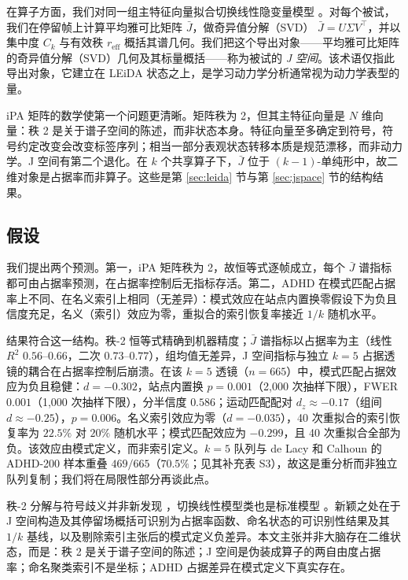 \documentclass[11pt]{ctexart}
\theoremstyle{definition}
\begin{document}
在算子方面，我们对同一组主特征向量拟合切换线性隐变量模型 \cite{Linderman2017,Taghia2018}。对每个被试，我们在停留帧上计算平均雅可比矩阵 $\bar J$，做奇异值分解（SVD） $\bar J=U\Sigma V^{\top}$，并以集中度 $C_k$ 与有效秩 $r_{\mathrm{eff}}$ 概括其谱几何。我们把这个导出对象——平均雅可比矩阵的奇异值分解（SVD）几何及其标量概括——称为被试的 \emph{J 空间}。该术语仅指此导出对象，它建立在 LEiDA 状态之上，是学习动力学分析通常视为动力学表型的量。

iPA 矩阵的数学使第一个问题更清晰。矩阵秩为 2，但其主特征向量是 $N$ 维向量：秩 2 是关于谱子空间的陈述，而非状态本身。特征向量至多确定到符号，符号约定改变会改变标签序列；相当一部分表观状态转移本质是规范漂移，而非动力学。J 空间有第二个退化。在 $k$ 个共享算子下，$\bar J$ 位于 $(k-1)$-单纯形中，故二维对象是占据率而非算子。这些是第 \ref{sec:leida} 节与第 \ref{sec:jspace} 节的结构结果。

\subsection*{假设}

我们提出两个预测。第一，iPA 矩阵秩为 2，故恒等式逐帧成立，每个 $\bar J$ 谱指标都可由占据率预测，在占据率控制后无指标存活。第二，ADHD 在模式匹配占据率上不同、在名义索引上相同（无差异）：模式效应在站点内置换零假设下为负且信度充足，名义（索引）效应为零，重拟合的索引恢复率接近 $1/k$ 随机水平。

结果符合这一结构。秩-2 恒等式精确到机器精度；$\bar J$ 谱指标以占据率为主（线性 $R^2$ $0.56$--$0.66$，二次 $0.73$--$0.77$），组均值无差异，J 空间指标与独立 $k=5$ 占据透镜的耦合在占据率控制后崩溃。在该 $k=5$ 透镜（$n=665$）中，模式匹配占据效应为负且稳健：$d=-0.302$，站点内置换 $p=0.001$（2,000 次抽样下限），FWER $0.001$（1,000 次抽样下限），分半信度 $0.586$；运动匹配配对 $d_z\approx-0.17$（组间 $d\approx-0.25$），$p=0.006$。名义索引效应为零（$d=-0.035$），40 次重拟合的索引恢复率为 $22.5\%$ 对 $20\%$ 随机水平；模式匹配效应为 $-0.299$，且 40 次重拟合全部为负。该效应由模式定义，而非索引定义。$k=5$ 队列与 de Lacy 和 Calhoun \cite{deLacy2019} 的 ADHD-200 样本重叠 $469/665$（$70.5\%$；见其补充表 S3），故这是重分析而非独立队列复制；我们将在局限性部分再谈此点。

秩-2 分解与符号歧义并非新发现 \cite{Glerean2012,Olsen2022,EiDA2024}，切换线性模型类也是标准模型 \cite{Linderman2017,Taghia2018}。新颖之处在于 J 空间构造及其停留场概括可识别为占据率函数、命名状态的可识别性结果及其 $1/k$ 基线，以及剔除索引主张后的模式定义负差异。本文主张并非大脑存在二维状态，而是：秩 2 是关于谱子空间的陈述；J 空间是伪装成算子的两自由度占据率；命名聚类索引不是坐标；ADHD 占据差异在模式定义下真实存在。
\end{document}
